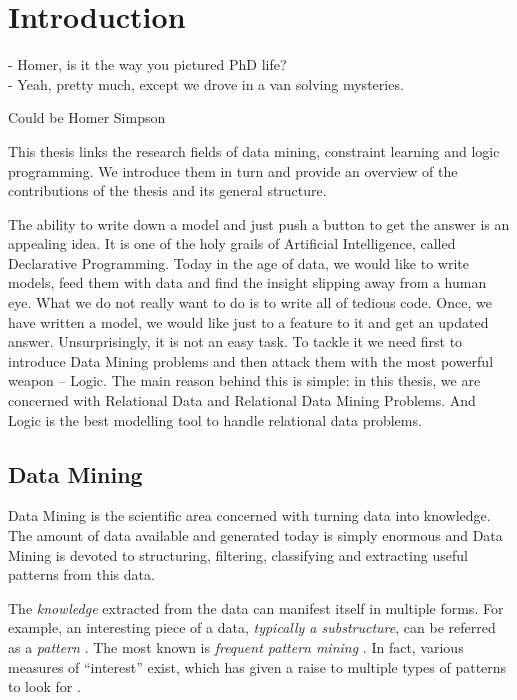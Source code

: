 \chapter{Introduction}\label{ch:introduction}
\epigraph{
- Homer, is it the way you pictured PhD life?\\
- Yeah, pretty much, except we drove in a van solving mysteries.
}{Could be Homer Simpson}

\begin{addmargin}[2em]{2em}
This thesis links the research fields of data mining, constraint learning
and logic programming. We introduce them in turn and provide an overview of the
contributions of the thesis and
its general structure.
\end{addmargin}

The ability to write down a model and just push a button to get the
answer is an appealing idea. It is one of the holy grails of
Artificial Intelligence, called Declarative Programming. Today in the age of data, we would like
to write models, feed them with data and find the insight slipping
away from a human eye. What we do not really want to do is to write
all of tedious code. Once, we have written a model, we would like just
to a feature to it and get an updated answer. Unsurprisingly, it is
not an easy task. To tackle it we need first to introduce Data Mining
problems and then attack them with the most powerful weapon -- Logic.
The main reason behind this is simple: in this thesis, we are
concerned with Relational Data and Relational Data Mining Problems.
And Logic is the best modelling tool to handle relational data
problems.

\section{Data Mining}
Data Mining is the scientific area concerned with turning data into
knowledge. The amount of data available and generated today is simply
enormous and Data Mining is
devoted to structuring, filtering, classifying and extracting useful
patterns from this data.

The \textit{knowledge} extracted from the data can manifest itself in
multiple forms. For example, an interesting piece of a data,
\textit{typically a substructure}, can be
referred as a \textit{pattern} \parencite{han_book}. The most known is
\textit{frequent pattern mining} \parencite{survey_han}. In fact, various measures of
``interest'' exist, which has given a raise to multiple types of
patterns to look for \parencite{tias_topk}.


